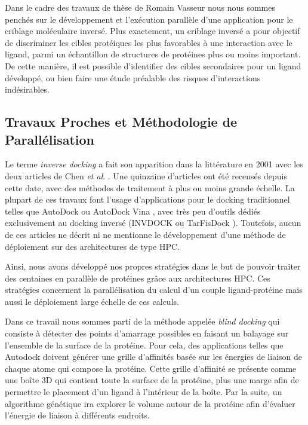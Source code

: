 Dans le cadre des travaux de thèse de Romain Vasseur nous nous sommes penchés sur le développement et l'exécution parallèle d'une application pour le criblage moléculaire inversé. Plus exactement, un criblage inversé a pour objectif de discriminer les cibles protéiques les plus favorables à une interaction avec le ligand, parmi un échantillon de structures de protéines plus ou moins important. De cette manière, il est possible d'identifier des cibles secondaires pour un ligand développé, ou bien faire une étude préalable des risques d'interactions indésirables. 

\subsection{Travaux Proches et Méthodologie de Parallélisation}

Le terme \textit{inverse docking} a fait son apparition dans la littérature en 2001 avec les deux articles de Chen \textit{et al}. \cite{Chen2001,Chen2001b}. Une quinzaine d'articles ont été recensés depuis cette date, avec des méthodes de traitement à plus ou moins grande échelle. La plupart de ces travaux font l'usage d'applications pour le docking traditionnel telles que AutoDock \cite{Steffen07} ou AutoDock Vina \cite{Lauro2011,Lauro2012}, avec très peu d'outils dédiés exclusivement au docking inversé (INVDOCK \cite{Chen2001,Chen2001b} ou TarFisDock \cite{Li2006}). Toutefois, aucun de ces articles ne décrit ni ne mentionne le développement d'une méthode de déploiement sur des architectures de type HPC.

Ainsi, nous avons développé nos propres stratégies dans le but de pouvoir traiter des centaines en parallèle de protéines grâce aux architectures HPC.
Ces stratégies concernent la parallélisation du calcul d'un couple ligand-protéine mais aussi le déploiement large échelle de ces calculs. 

Dans ce travail nous sommes parti de la méthode appelée \textit{blind docking} qui consiste à détecter des points d'amarrage possibles en faisant un balayage sur l'ensemble de la surface de la protéine. Pour cela, des applications telles que Autodock doivent générer une grille d'affinités basée sur les énergies de liaison de chaque atome qui compose la protéine. Cette grille d'affinité se présente comme une boîte 3D qui contient toute la surface de la protéine, plus une marge afin de permettre le placement d'un ligand à l'intérieur de la boîte. Par la suite, un algorithme génétique ira explorer le volume autour de la protéine afin d'évaluer l'énergie de liaison à différents endroits. 


